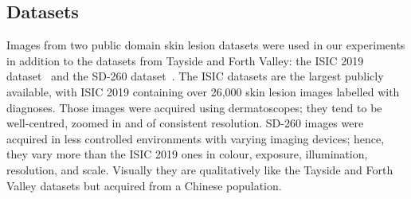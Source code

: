 \subsection{Datasets}
\label{subsec:generalisation_datasets}
Images from two public domain skin lesion datasets were used in our experiments in addition to the datasets from Tayside and Forth Valley: the ISIC 2019 dataset~\citep{codella2018skin,combalia2019bcn20000,tschandl2018ham10000} and the SD-260 dataset~\citep{yang2019self}. The ISIC datasets are the largest publicly available, with ISIC 2019 containing over 26,000 skin lesion images labelled with diagnoses. Those images were acquired using dermatoscopes; they tend to be well-centred, zoomed in and of consistent resolution. SD-260 images were acquired in less controlled environments with varying imaging devices; hence, they vary more than the ISIC 2019 ones in colour, exposure, illumination, resolution, and scale. Visually they are qualitatively like the Tayside and Forth Valley datasets but acquired from a Chinese population.

